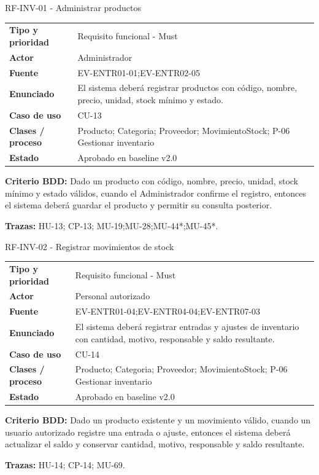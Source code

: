 \begin{reqbox}{RF-INV-01 - Administrar productos}
\begin{tabularx}{\textwidth}{>{\bfseries}p{3.2cm}Y}
Tipo y prioridad & Requisito funcional - Must \\
Actor & Administrador \\
Fuente & EV-ENTR01-01;EV-ENTR02-05 \\
Enunciado & El sistema deberá registrar productos con código, nombre, precio, unidad, stock mínimo y estado. \\
Caso de uso & CU-13 \\
Clases / proceso & Producto; Categoria; Proveedor; MovimientoStock; P-06 Gestionar inventario \\
Estado & Aprobado en baseline v2.0 \\
\end{tabularx}
\textbf{Criterio BDD:} Dado un producto con código, nombre, precio, unidad, stock mínimo y estado válidos, cuando el Administrador confirme el registro, entonces el sistema deberá guardar el producto y permitir su consulta posterior.

\textbf{Trazas:} HU-13; CP-13; MU-19;MU-28;MU-44*;MU-45*.
\end{reqbox}


\begin{reqbox}{RF-INV-02 - Registrar movimientos de stock}
\begin{tabularx}{\textwidth}{>{\bfseries}p{3.2cm}Y}
Tipo y prioridad & Requisito funcional - Must \\
Actor & Personal autorizado \\
Fuente & EV-ENTR01-04;EV-ENTR04-04;EV-ENTR07-03 \\
Enunciado & El sistema deberá registrar entradas y ajustes de inventario con cantidad, motivo, responsable y saldo resultante. \\
Caso de uso & CU-14 \\
Clases / proceso & Producto; Categoria; Proveedor; MovimientoStock; P-06 Gestionar inventario \\
Estado & Aprobado en baseline v2.0 \\
\end{tabularx}
\textbf{Criterio BDD:} Dado un producto existente y un movimiento válido, cuando un usuario autorizado registre una entrada o ajuste, entonces el sistema deberá actualizar el saldo y conservar cantidad, motivo, responsable y saldo resultante.

\textbf{Trazas:} HU-14; CP-14; MU-69.
\end{reqbox}


